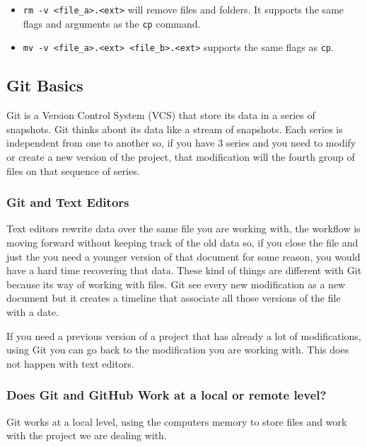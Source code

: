\documentclass{article}
\begin{document}
\begin{itemize}
    	\item {\tt rm -v <file\_a>.<ext>} will remove files and folders. It supports the same flags and arguments as the {\tt cp} command.
    	
    	\item {\tt mv -v <file\_a>.<ext> <file\_b>.<ext>} supports the same flags as {\tt cp}.
    \end{itemize}
    
    \subsection{Git Basics}
    
    Git is a Version Control System (VCS) that store its data in a series of snapshots. Git thinks about its data like a stream of snapshots. Each series is independent from one to another so, if you have 3 series and you need to modify or create a new version of the project, that modification will the fourth group of files on that sequence of series. \par
    
    \subsubsection{Git and Text Editors}
	
	
	Text editors rewrite data over the same file you are working with, the workflow is moving forward without keeping track of the old data so, if you close the file and just the you need a younger version of that document for some reason, you would have a hard time recovering that data. These kind of things are different with Git because its way of working with files. Git see every new modification as a new document but it creates a timeline that associate all those versions of the file with a date.\par
	
	If you need a previous version of a project that has already a lot of modifications, using Git you can go back to the modification you are working with. This does not happen with text editors.
	
	\subsubsection{Does Git and GitHub Work at a local or remote level?}
	
	Git works at a local level, using the computers memory to store files and work with the project we are dealing with.\par
	
\end{document}
